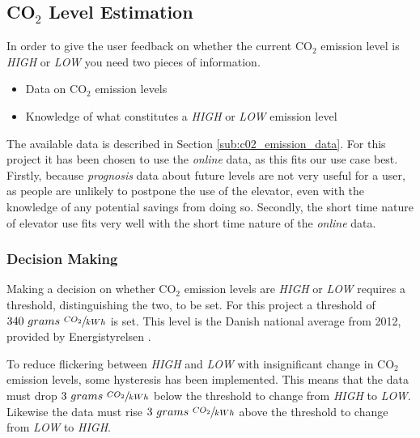 \documentclass[Main]{subfiles}
\begin{document}
\subsection{CO$_2$ Level Estimation} %
\label{sub:co__2_level_estimation}

	In order to give the user feedback on whether the current CO$_2$ emission level is \emph{HIGH} or \emph{LOW} you need two pieces of information.

	\begin{itemize}
		\item Data on CO$_2$ emission levels
		\item Knowledge of what constitutes a \emph{HIGH} or \emph{LOW} emission level
	\end{itemize}

	The available data is described in Section \ref{sub:c02_emission_data}.
	For this project it has been chosen to use the \emph{online} data, as this fits our use case best.
	Firstly, because \emph{prognosis} data about future levels are not very useful for a user, as people are unlikely to postpone the use of the elevator, even with the knowledge of any potential savings from doing so.
	Secondly, the short time nature of elevator use fits very well with the short time nature of the \emph{online} data.
 

	\subsubsection{Decision Making} %
	\label{sub:decision_making}

		Making a decision on whether CO$_2$ emission levels are \emph{HIGH} or \emph{LOW} requires a threshold, distinguishing the two, to be set.
		For this project a threshold of $340\ grams\ \sfrac{CO_2}{kWh}$ is set.
		This level is the Danish national average from 2012, provided by Energistyrelsen \cite{Energistyrelsen:2012:Online}.

		To reduce flickering between \emph{HIGH} and \emph{LOW} with insignificant change in CO$_2$ emission levels, some hysteresis has been implemented.
		This means that the data must drop $3\ grams\ \sfrac{CO_2}{kWh}$ below the threshold to change from \emph{HIGH} to \emph{LOW}.
		Likewise the data must rise $3\ grams\ \sfrac{CO_2}{kWh}$ above the threshold to change from \emph{LOW} to \emph{HIGH}.
	
\end{document}
